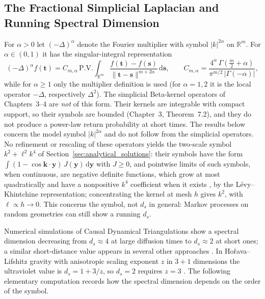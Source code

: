 \documentclass[11pt,a4paper,reqno]{amsart}
\theoremstyle{definition}
\numberwithin{equation}{section}
\providecommand{\R}{\mathbb{R}}
\newcommand{\dif}{\,\mathrm{d}}
\providecommand{\xref}[2]{#2}
\providecommand{\R}{\mathbb{R}}
\begin{document}
\subsection{The Fractional Simplicial Laplacian and Running Spectral Dimension}
For $\alpha > 0$ let $(-\Delta)^\alpha$ denote the Fourier multiplier with symbol $|k|^{2\alpha}$ on $\R^m$. For $\alpha \in (0,1)$ it has the singular-integral representation
\begin{equation}
    \label{eq:frac_simplicial_laplacian}
    (-\Delta)^\alpha f(\mathbf{t}) = C_{m,\alpha}\, \mathrm{P.V.}\!\int_{\R^m} \frac{f(\mathbf{t}) - f(\mathbf{s})}{\|\mathbf{t} - \mathbf{s}\|^{m + 2\alpha}} \dif \mathbf{s}, \qquad C_{m,\alpha} = \frac{4^\alpha\, \Gamma\!\left(\frac{m}{2}+\alpha\right)}{\pi^{m/2}\, |\Gamma(-\alpha)|},
\end{equation}
while for $\alpha \ge 1$ only the multiplier definition is used (for $\alpha = 1, 2$ it is the local operator $-\Delta$, respectively $\Delta^2$). The simplicial Beta-kernel operators of Chapters~3--4 \cite{silvafilho2026pascal} are \emph{not} of this form. Their kernels are integrable with compact support, so their symbols are bounded (Chapter~3, Theorem~\xref{chap03:thm:laplacian_symbol}{7.2}), and they do not produce a power-law return probability at short times. The results below concern the model symbol $|k|^{2\alpha}$ and do not follow from the simplicial operators. No refinement or rescaling of these operators yields the two-scale symbol $k^2 + \ell^2 k^4$ of Section~\ref{sec:analytical_solutions}: their symbols have the form $\int (1 - \cos \mathbf{k}\cdot\mathbf{y})\, J(\mathbf{y}) \dif\mathbf{y}$ with $J \ge 0$, and pointwise limits of such symbols, when continuous, are negative definite functions, which grow at most quadratically and have a nonpositive $k^4$ coefficient when it exists \cite{berg1975potential}, by the L\'evy--Khintchine representation; concentrating the kernel at mesh $h$ gives $k^2$, with $\ell \propto h \to 0$. This concerns the symbol, not $d_s$ in general: Markov processes on random geometries can still show a running $d_s$.

Numerical simulations of Causal Dynamical Triangulations \cite{ambjorn2005spectral} show a spectral dimension decreasing from $d_s \approx 4$ at large diffusion times to $d_s \approx 2$ at short ones; a similar short-distance value appears in several other approaches \cite{carlip2017dimension}. In Ho\v{r}ava--Lifshitz gravity with anisotropic scaling exponent $z$ in $3+1$ dimensions the ultraviolet value is $d_s = 1 + 3/z$, so $d_s = 2$ requires $z = 3$ \cite{horava2009spectral}. The following elementary computation records how the spectral dimension depends on the order of the symbol.
\end{document}
